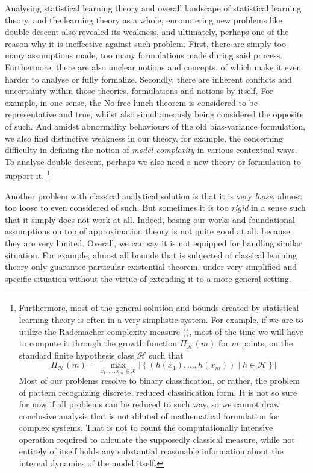\documentclass[10pt]{article}
\begin{document}
Analysing statistical learning theory and overall landscape of statistical learning theory, and the learning theory as a whole, encountering new problems like double descent also revealed its weakness, and ultimately, perhaps one of the reason why it is ineffective against such problem. First, there are simply too many assumptions made, too many formulations made during said process. Furthermore, there are also unclear notions and concepts, of which make it even harder to analyse or fully formalize. Secondly, there are inherent conflicts and uncertainty within those theories, formulations and notions by itself. For example, in one sense, the No-free-lunch theorem is considered to be representative and true, whilst also simultaneously being considered the opposite of such. And amidst abnormality behaviours of the old bias-variance formulation, we also find distinctive weakness in our theory, for example, the concerning difficulty in defining the notion of \textit{model complexity} in various contextual ways. To analyse double descent, perhaps we also need a new theory or formulation to support it. \footnote{Furthermore, most of the general solution and bounds created by statistical learning theory is often in a very simplistic system. For example, if we are to utilize the Rademacher complexity measure (\cite{10.5555/2371238}), most of the time we will have to compute it through the growth function $\Pi_{\mathcal{H}}(m)$ for $m$ points, on the standard finite hypothesis class $\mathcal{H}$ such that 
\begin{equation}
    \Pi_{\mathcal{H}}(m) = \max_{x_1, \dots, x_m \in \mathcal{X}} \left| \left\{ (h(x_1), \dots, h(x_m)) \mid h \in \mathcal{H} \right\} \right|
\end{equation}
Most of our problems resolve to binary classification, or rather, the problem of pattern recognizing discrete, reduced classification form. It is not so sure for now if all problems can be reduced to such way, so we cannot draw conclusive analysis that is not diluted of mathematical formulation for complex systems. That is not to count the computationally intensive operation required to calculate the supposedly classical measure, while not entirely of itself holds any substantial reasonable information about the internal dynamics of the model itself. }

Another problem with classical analytical solution is that it is very \textit{loose}, almost too loose to even considered of such. But sometimes it is too \textit{rigid} in a sense such that it simply does not work at all. Indeed, basing our works and foundational assumptions on top of approximation theory is not quite good at all, because they are very limited. Overall, we can say it is not equipped for handling similar situation. For example, almost all bounds that is subjected of classical learning theory only guarantee particular existential theorem, under very simplified and specific situation without the virtue of extending it to a more general setting. 
\end{document}

